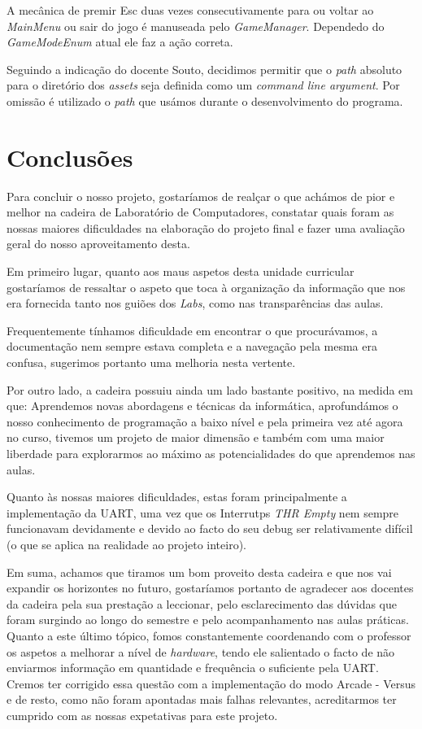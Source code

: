 \documentclass{report}
\begin{document}
A mecânica de premir Esc duas vezes consecutivamente para ou voltar ao \textit{MainMenu} ou sair do jogo é manuseada pelo \textit{GameManager}. Dependedo do \textit{GameModeEnum} atual ele faz a ação correta.

Seguindo a indicação do docente Souto, decidimos permitir que o \textit{path} absoluto para o diretório dos \textit{assets} seja definida como um \textit{command line argument}. Por omissão é utilizado o \textit{path} que usámos durante o desenvolvimento do programa.

\chapter{Conclusões}

Para concluir o nosso projeto, gostaríamos de realçar o que achámos de pior e melhor na cadeira de Laboratório de Computadores, constatar quais foram as nossas maiores dificuldades na elaboração do projeto final e fazer uma avaliação geral do nosso aproveitamento desta.

Em primeiro lugar, quanto aos maus aspetos desta unidade curricular gostaríamos de ressaltar o aspeto que toca à organização da informação que nos era fornecida tanto nos guiões dos \textit{Labs}, como nas transparências das aulas. 

Frequentemente tínhamos dificuldade em encontrar o que procurávamos, a documentação nem sempre estava completa e a navegação pela mesma era confusa, sugerimos portanto uma melhoria nesta vertente.

Por outro lado, a cadeira possuiu ainda um lado bastante positivo, na medida em que: Aprendemos novas abordagens e técnicas da informática, aprofundámos o nosso conhecimento de programação a baixo nível e pela primeira vez até agora no curso, tivemos um projeto de maior dimensão e também com uma maior liberdade para explorarmos ao máximo as potencialidades do que aprendemos nas aulas.

Quanto às nossas maiores dificuldades, estas foram principalmente a implementação da UART, uma vez que os Interrutps \textit{THR Empty} nem sempre funcionavam devidamente e devido ao facto do seu debug ser relativamente difícil (o que se aplica na realidade ao projeto inteiro).

Em suma, achamos que tiramos um bom proveito desta cadeira e que nos vai expandir os horizontes no futuro, gostaríamos portanto de agradecer aos docentes da cadeira pela sua prestação a leccionar, pelo esclarecimento das dúvidas que foram surgindo ao longo do semestre e pelo acompanhamento nas aulas práticas. Quanto a este último tópico, fomos constantemente coordenando com o professor os aspetos a melhorar a nível de \textit{hardware}, tendo ele salientado o facto de não enviarmos informação em quantidade e frequência o suficiente pela UART. Cremos ter corrigido essa questão com a implementação do modo Arcade - Versus e de resto, como não foram apontadas mais falhas relevantes, acreditarmos ter cumprido com as nossas expetativas para este projeto.

\paragraph{}
\end{document}
